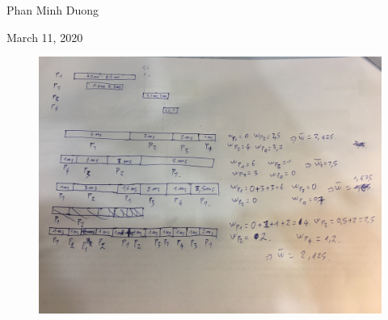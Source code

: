 \documentclass[article, paper=a4, fontsize=11pt]{scrartcl}
\begin{document}
\begin{center}
Phan Minh Duong
\end{center}
\begin{center}
March 11, 2020
\end{center}
\begin{figure}[h!]
 \centering
  \includegraphics[width=\linewidth]{exercise2.JPG}
  \label{fig:boat1}
 
\end{figure}
\end{document}
